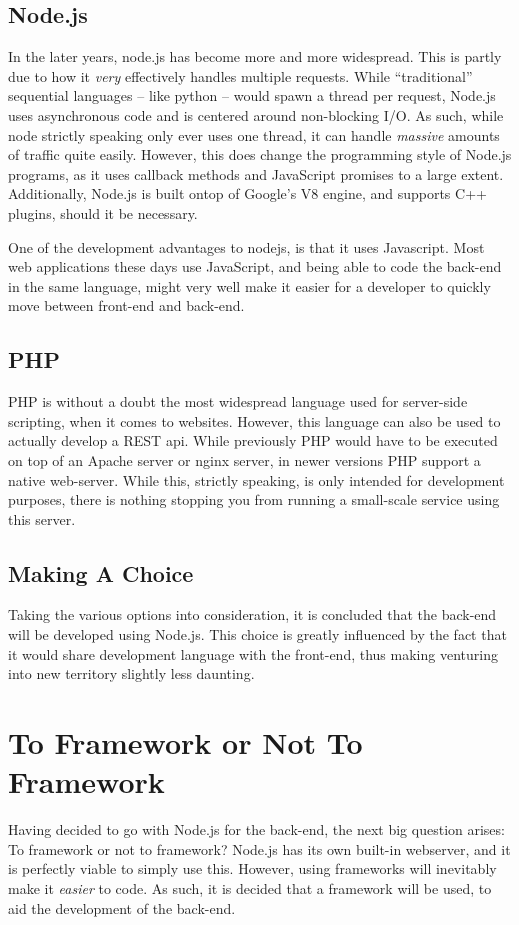 		\subsection{Node.js}
			In the later years, node.js has become more and more widespread. This is partly due to how it \emph{very} effectively handles multiple requests. While ``traditional'' sequential languages -- like python -- would spawn a thread per request, Node.js uses asynchronous code and is centered around non-blocking I/O. As such, while node strictly speaking only ever uses one thread, it can handle \emph{massive} amounts of traffic quite easily. However, this does change the programming style of Node.js programs, as it uses callback methods and JavaScript promises to a large extent. Additionally, Node.js is built ontop of Google's V8 engine, and supports C++ plugins, should it be necessary.

			One of the development advantages to nodejs, is that it uses Javascript. Most web applications these days use JavaScript, and being able to code the back-end in the same language, might very well make it easier for a developer to quickly move between front-end and back-end.

		\subsection{PHP}
			PHP is without a doubt the most widespread language used for server-side scripting, when it comes to websites. However, this language can also be used to actually develop a REST api. While previously PHP would have to be executed on top of an Apache server or nginx server, in newer versions PHP support a native web-server. While this, strictly speaking, is only intended for development purposes, there is nothing stopping you from running a small-scale service using this server.

		\subsection{Making A Choice}
			Taking the various options into consideration, it is concluded that the back-end will be developed using Node.js. This choice is greatly influenced by the fact that it would share development language with the front-end, thus making venturing into new territory slightly less daunting.

	\section{To Framework or Not To Framework}
		Having decided to go with Node.js for the back-end, the next big question arises: To framework or not to framework? Node.js has its own built-in webserver, and it is perfectly viable to simply use this. However, using frameworks will inevitably make it \emph{easier} to code. As such, it is decided that a framework will be used, to aid the development of the back-end.

